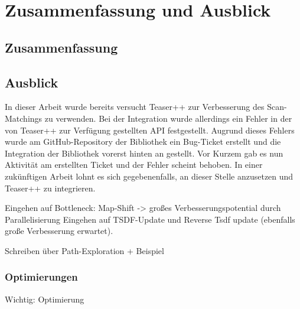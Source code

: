 \chapter{Zusammenfassung und Ausblick}
\label{chapter:ausblick}

\section{Zusammenfassung}


\section{Ausblick}

In dieser Arbeit wurde bereits versucht Teaser++ zur Verbesserung des Scan-Matchings zu verwenden. Bei der Integration wurde allerdings ein Fehler in der von Teaser++ zur Verfügung gestellten API festgestellt. Augrund dieses Fehlers wurde am GitHub-Repository der Bibliothek ein Bug-Ticket erstellt und die Integration der Bibliothek vorerst hinten an gestellt. Vor Kurzem gab es nun Aktivität am erstellten Ticket und der Fehler scheint behoben. In einer zukünftigen Arbeit lohnt es sich gegebenenfalls, an dieser Stelle anzusetzen und Teaser++ zu integrieren.

Eingehen auf Bottleneck: Map-Shift -> großes Verbesserungspotential durch Parallelisierung
Eingehen auf TSDF-Update und Reverse Tsdf update (ebenfalls große Verbesserung erwartet).

Schreiben über Path-Exploration + Beispiel

\subsection{Optimierungen}

Wichtig: Optimierung
